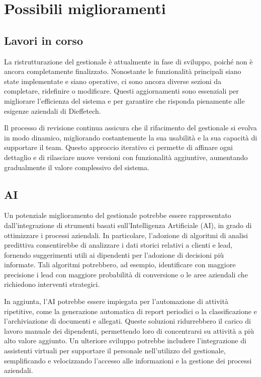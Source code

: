 \chapter{Possibili miglioramenti}\label{chapter:migliorie}
\section{Lavori in corso}\label{sec:cap_sec_subsec_lavori_in_corso}

La ristrutturazione del gestionale è attualmente in fase di sviluppo, poiché non è ancora completamente finalizzato. Nonostante le funzionalità principali siano state implementate e siano operative, ci sono ancora diverse sezioni da completare, ridefinire o modificare. Questi aggiornamenti sono essenziali per migliorare l'efficienza del sistema e per garantire che risponda pienamente alle esigenze aziendali di Dieffetech.

Il processo di revisione continua assicura che il rifacimento del gestionale si evolva in modo dinamico, migliorando costantemente la sua usabilità e la sua capacità di supportare il team. Questo approccio iterativo ci permette di affinare ogni dettaglio e di rilasciare nuove versioni con funzionalità aggiuntive, aumentando gradualmente il valore complessivo del sistema. 

\section{AI}\label{sec:cap_sec_subsec_AI}

Un potenziale miglioramento del gestionale potrebbe essere rappresentato dall’integrazione di strumenti basati sull’Intelligenza Artificiale (AI), in grado di ottimizzare i processi aziendali. In particolare, l'adozione di algoritmi di analisi predittiva consentirebbe di analizzare i dati storici relativi a clienti e lead, fornendo suggerimenti utili ai dipendenti per l'adozione di decisioni più informate. Tali algoritmi potrebbero, ad esempio, identificare con maggiore precisione i lead con maggiore probabilità di conversione o le aree aziendali che richiedono interventi strategici.

In aggiunta, l'AI potrebbe essere impiegata per l'automazione di attività ripetitive, come la generazione automatica di report periodici o la classificazione e l’archiviazione di documenti e allegati. Queste soluzioni ridurrebbero il carico di lavoro manuale dei dipendenti, permettendo loro di concentrarsi su attività a più alto valore aggiunto. Un ulteriore sviluppo potrebbe includere l'integrazione di assistenti virtuali per supportare il personale nell'utilizzo del gestionale, semplificando e velocizzando l'accesso alle informazioni e la gestione dei processi aziendali.

